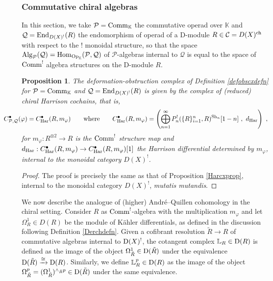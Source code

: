 \documentclass[11pt]{amsart}
\numberwithin{equation}{section}
\newtheorem{prop}[theo]{Proposition}
\theoremstyle{definition}
\newcommand{\bb}{\mathbb}
\newcommand{\mc}{\mathcal}
\newcommand{\Har}{{\textup{Har}}}
\newcommand{\bL}{{\mathbb{L}}}
\DeclareMathOperator{\Hom}{Hom}
\newcommand{\K}{{\bb K}}
\newcommand{\End}{{\textup{End}}}
\newcommand{\Sh}{{\textup{Sh}}}
\newcommand{\Alg}{{\textup{Alg}}}
\newcommand{\Comm}{{\textup{Comm}}}
\newcommand{\ch}{{\textup{ch}}}
\newcommand{\Op}{{\textup{Op}}}
\newcommand{\0}{{\textbf{0}}}
\newcommand{\Dd}{{\textup{D}}}
\newcommand{\DD}{{D}}
\def\ch{{\rm ch}}
\def \Op{\mathrm{Op}}
\begin{document}
\subsubsection{Commutative chiral algebras}

In this section, we take $\mc P=\Comm_\K$ the commutative operad over $\K$ and $\mc Q=\End_{\DD(X)^!}(R)$ the endomorphism of operad of a D-module $R\in \mc C = \DD(X)^\ch$ with respect to the $!$ monoidal structure, so that the space $\Alg_{\mc P}(\mc Q)=\Hom_{\Op_\K}(\mc P,\mc Q)$ of $\mc P$-algebras internal to $\mc Q$ is equal to the space of $\Comm^!$ algebra structures on the D-module $R$.


\begin{prop}\label{chHoccxprop}
	The deformation-obstruction complex of Definition \ref{defobscxdefn} for $\mc P=\Comm_\K$ and $\mc Q=\End_{\DD(X)^!}(R)$ is given by the complex of (reduced) chiral Harrison cochains, that is,
	\[ \hspace*{-1cm} C^\bullet_{\mc P,\mc Q}(\varphi) = C^\bullet_{\Har}(R,m_\varphi) \qquad \text{where}\qquad C^\bullet_{\Har}(R,m_\varphi) = \left( \bigoplus_{n=1}^\infty  P_n^!(\{R\}_{i=1}^n , R)^{\Sh_n}[1-n] \ , \ d_\textup{Har} \right)  \ , \]
	for $m_\varphi:R^{\otimes 2} \to R$ is the $\Comm^!$ structure map and $d_\text{Har}:C^\bullet_{\Har}(R,m_\varphi) \to C^\bullet_{\Har}(R,m_\varphi)[1]$ the Harrison differential determined by $m_\varphi$, internal to the monoidal category $\DD(X)^!$.
\end{prop}
\begin{proof} The proof is precisely the same as that of Proposition \ref{Harcxprop}, internal to the monoidal category $\DD(X)^!$, \emph{mutatis mutandis}.
\end{proof}

We now describe the analogue of (higher) Andr\'e--Quillen cohomology in the chiral setting. Consider 
$R$ as $\Comm^!$-algebra with the multiplication $m_\varphi$ and let $\Omega^1_R\in \DD(R)$ be the module of K\"ahler differentials, as defined in the discussion following Definition \ref{Derchdefn}. Given a cofibrant resolution $\tilde R \to R$ of commutative algebras internal to $\Dd(X)^!$, the cotangent complex $\bL_R\in \Dd(R)$ is defined as the image of the object $\Omega^1_{\tilde R} \in \Dd(\tilde R)$ under the equivalence $\Dd(\tilde R) \xrightarrow{\cong} \Dd(R)$. Similarly, we define $\bL^{p}_R\in \Dd(R)$ as the image of the object $\Omega^p_{\tilde R} = (\Omega^1_{\tilde R})^{\wedge_{\tilde R} p} \in \Dd(\tilde R)$ under the same equivalence.
\end{document}
